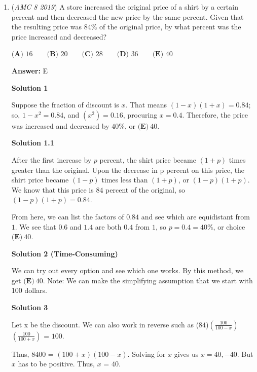 \begin{enumerate}
 


	\item (\textit{AMC 8 2019}) A store increased the original price of a shirt by a certain percent and then decreased the new price by the same percent. Given that the resulting price was $84\%$ of the original price, by what percent was the price increased and decreased?


 $\textbf{(A) }16\qquad\textbf{(B) }20\qquad\textbf{(C) }28\qquad\textbf{(D) }36\qquad\textbf{(E) }40$

 \textbf{Answer: }E



\textbf{Solution 1}

Suppose the fraction of discount is $x$. That means $(1-x)(1+x)=0.84$; so, $1-x^{2}=0.84$, and $(x^{2})=0.16$, procuring $x=0.4$. Therefore, the price was increased and decreased by $40$\%, or $\boxed{\textbf{(E)}\ 40}$.

 



\textbf{Solution 1.1}

After the first increase by $p$ percent, the shirt price became $(1+p)$ times greater than the original. Upon the decrease in p percent on this price, the shirt price became $(1-p)$ times less than $(1+p)$, or $(1-p)(1+p)$. We know that this price is $84$ percent of the original, so $(1-p)(1+p) = 0.84$. 

 


 From here, we can list the factors of $0.84$ and see which are equidistant from $1$. We see that $0.6$ and $1.4$ are both $0.4$ from $1$, so $p = 0.4 = 40 \%$, or choice $\boxed{\textbf{(E)}\ 40}$. 

 



\textbf{Solution 2 (Time-Consuming)}

We can try out every option and see which one works. By this method, we get $\boxed{\textbf{(E)}\ 40}$. Note: We can make the simplifying assumption that we start with 100 dollars.

 



\textbf{Solution 3}

Let x be the discount. We can also work in reverse such as ($84$)$(\frac{100}{100-x})$$(\frac{100}{100+x})$ = $100$.

 Thus, $8400$ = $(100+x)(100-x)$. Solving for $x$ gives us $x = 40, -40$. But $x$ has to be positive. Thus, $x$ = $40$.

 




\end{enumerate}
